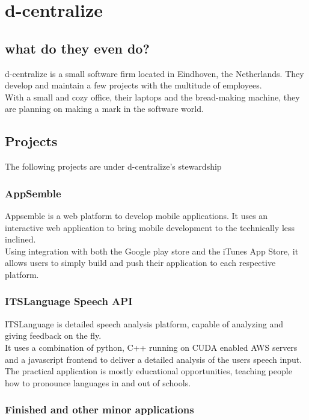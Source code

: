 \chapter{d-centralize}
\section{what do they even do?}
d-centralize is a small software firm located in Eindhoven, the Netherlands. They develop and maintain a few projects with the multitude of employees. \\

With a small and cozy office, their laptops and the bread-making machine, they are planning on making a mark in the software world.

\section{Projects}

The following projects are under d-centralize's stewardship

\subsection{AppSemble}
Appsemble is a web platform to develop mobile applications. It uses an interactive web application to bring mobile development to the technically less inclined. \cite{dcent1} \\

Using integration with both the Google play store and the iTunes App Store, it allows users to simply build and push their application to each respective platform.

\subsection{ITSLanguage Speech API}
ITSLanguage is detailed speech analysis platform, capable of analyzing and giving feedback on the fly. \\

It uses a combination of python, C++ running on CUDA enabled AWS servers and a javascript frontend to deliver a detailed analysis of the users speech input. \\

The practical application is mostly educational opportunities, teaching people how to pronounce languages in and out of schools.

\subsection{Finished and other minor applications}


